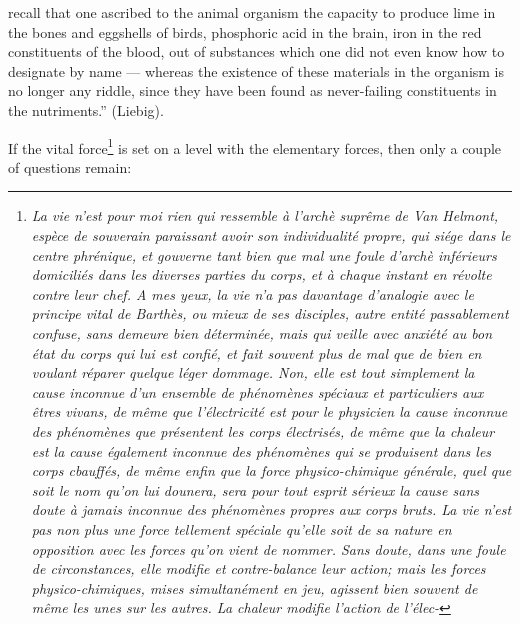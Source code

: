 \documentclass[12pt,a4paper]{book}
\begin{document}
recall that one ascribed to the animal organism the capacity to produce lime in
the bones and eggshells of birds,
phosphoric acid in the brain, iron in the red constituents of the blood, out of
substances which one did not even know how to designate by name --- whereas the
existence of these materials in the organism is no longer any riddle, since
they have been found as never-failing constituents in the nutriments.''
(Liebig).

\setcounter{footnote}{0}
If the vital force\footnote{\textit{La vie n'est pour moi rien
qui ressemble à l'arch\`e suprême de Van Helmont, espèce de souverain
paraissant avoir son individualité propre, qui siége dans le centre
phrénique, et gouverne tant bien que mal une foule
d'\emph{arch\`e} inférieurs domiciliés dans les diverses parties du
corps, et à chaque instant en révolte contre leur chef. A mes yeux,
la vie n'a pas davantage d'analogie avec \emph{le principe vital} de
Barthès, ou mieux de ses disciples, autre entité passablement
confuse, sans demeure bien déterminée, mais qui veille avec anxiété
au bon état du corps qui lui est confié, et fait souvent plus de mal
que de bien en voulant réparer quelque léger dommage. Non, elle est
tout simplement la cause inconnue d'un ensemble de phénomènes
spéciaux et particuliers aux êtres vivans, de même que l'électricité
est pour le physicien la cause inconnue des phénomènes que
présentent les corps électrisés, de même que la chaleur est la cause
également inconnue des phénomènes qui se produisent dans les corps
cbauffés, de même enfin que la force physico-chimique générale, quel
que soit le nom qu'on lui dounera, sera pour tout esprit sérieux la
cause sans doute à jamais inconnue des phénomènes propres aux corps
bruts. La vie n'est pas non plus une force tellement spéciale
qu'elle soit de sa nature en opposition avec les forces qu'on vient
de nommer. Sans doute, dans une foule de circonstances, elle modifie
et contre-balance leur action; mais les forces physico-chimiques,
mises simultanément en jeu, agissent bien souvent de même les unes
sur les autres. La chaleur modifie l'action de l'élec-}
} is set on a level with the elementary forces, then only a couple of questions
remain:
\end{document}
